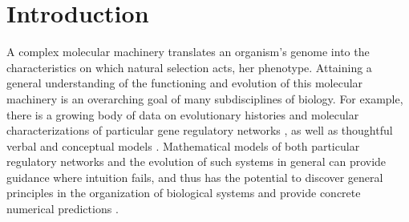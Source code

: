 \documentclass{article}
\newcommand{\1}{\mathbbm{1}}
\begin{document}
\section*{Introduction}

A complex molecular machinery translates an organism's genome into the characteristics on which natural selection acts,
her phenotype.
Attaining a general understanding of the functioning and evolution of this molecular machinery
is an overarching goal of many subdisciplines of biology.
For example, 
there is a growing body of data on evolutionary histories and molecular characterizations of particular gene regulatory networks
\citep{jaeger2011gap, davidson2006gene, israel2016comparative}, 
as well as thoughtful verbal and conceptual models \citep{true2001developmental, gwagner1, weiss2000phenogenetic, edelman2001degeneracy}. 
Mathematical models of both particular regulatory networks
and the evolution of such systems in general
can provide guidance where intuition fails,
and thus has the potential to discover general principles in the organization of biological systems 
and provide concrete numerical predictions \citep{servedio2014not}.
\end{document}
